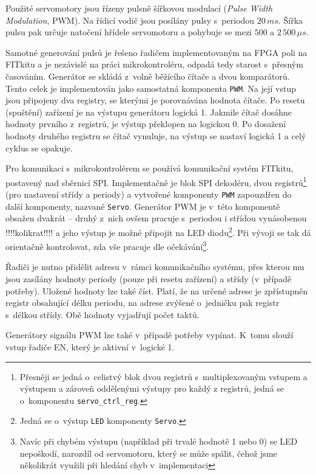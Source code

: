 Použité servomotory jsou řízeny pulsně šířkovou modulací (\emph{Pulse Width
Modulation}, PWM). Na řídicí vodič jsou posílány pulsy s~periodou $20\,ms$. Šířka
pulsu pak určuje natočení hřídele servomotoru a pohybuje se mezi $500$ a
$2\,500\,\mu{}s$. \cite{modelarska_stranka_dohledam_doma}

Samotné generování pulsů je řešeno řadičem implementovaným na FPGA poli na %
FITkitu a je nezávislé na práci mikrokontroléru, odpadá tedy starost s~přesným
časováním. Generátor se skládá z~volně běžícího čítače a dvou komparátorů. Tento
celek je implementován jako samostatná komponenta \texttt{PWM}. Na její vstup %
jsou připojeny dva registry, se kterými je porovnávána hodnota čítače. Po resetu
(spuštění) zařízení je na výstupu generátoru logická 1. Jakmile čítač dosáhne
hodnoty prvního z~registrů, je výstup překlopen na logickou 0. Po dosažení
hodnoty druhého registru se čítač vynuluje, na výstup se nastaví logická 1 a
celý cyklus se opakuje.

Pro komunikaci s~mikrokontrolérem se používá komunikační systém FITkitu,
postavený nad sběrnicí SPI\cite{fitkit_communication}. Implementačně je blok SPI
dekodéru, dvou registrů\footnote{Přesněji se jedná o~celistvý blok dvou registrů
s~multiplexovaným vstupem a výstupem a zároveň oddělenými výstupy pro každý z
registrů, jedná se o~komponentu \texttt{servo\_ctrl\_reg}.} (pro nastavení střídy
a periody) a vytvořené komponenty \texttt{PWM} zapouzdřen do další komponenty,
nazvané \texttt{Servo}. Generátor PWM je v~této komponentě obsažen dvakrát --
druhý z~nich ovšem pracuje s~periodou i střídou vynásobenou !!!!kolikrat!!!! a jeho
výstup je možné připojit na LED diodu\footnote{Jedná se o~výstup \texttt{LED}
komponenty \texttt{Servo}.}. Při vývoji se tak dá orientačně kontrolovat, zda
vše pracuje dle očekávání\footnote{Navíc při chybém výstupu (například při
trvalé hodnotě 1 nebo 0) se LED nepoškodí, narozdíl od servomotoru, který se
může spálit, čehož jsme několikrát využili při hledání chyb v~implementaci}.

Řadiči je nutno přidělit adresu v~rámci komunikačního systému, přes kterou mu
jsou zasílány hodnoty periody (pouze při resetu zařízení) a střídy (v~případě
potřeby). Uložené hodnoty lze také číst. Platí, že na určené adrese je
zpřístupněn registr obsahující délku periodu, na adrese zvýšené o~jedničku pak
registr s~délkou střídy. Obě hodnoty vyjadřují počet taktů.

Generátory signálu PWM lze také v~případě potřeby vypínat. K~tomu slouží vstup
řadiče EN, který je aktivní v~logické 1.

